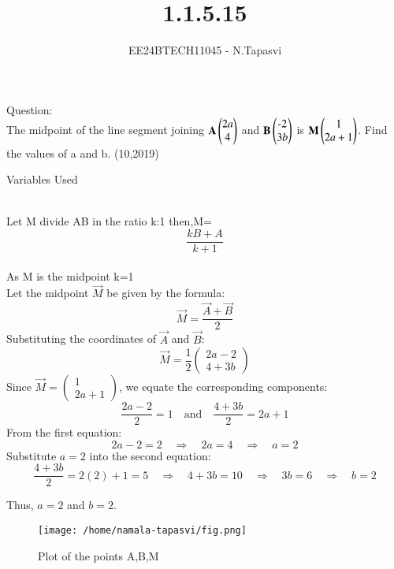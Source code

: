 \documentclass[journal]{IEEEtran}
\begin{document}

\vspace{3cm}

\title{1.1.5.15}
\author{EE24BTECH11045 - N.Tapasvi}
{\let\newpage\relax\maketitle}
Question:\\
The midpoint of the line segment joining $\mathbf{A}\begin{pmatrix}2a\\4\end{pmatrix}$ and $\mathbf{B}\begin{pmatrix}\text{-}2\\3b\end{pmatrix}$ is $\mathbf{M}\begin{pmatrix}1\\2a+1\end{pmatrix}$. Find the values of a and b.
\hfill (10,2019)

\solution
\begin{table}[h!]    
  \centering
  
  \caption{Variables Used}
  \label{tab1-1.5-15}
\end{table}\\

Let M divide AB in the ratio k:1
then,M=\[\frac{kB+A}{k+1}\]\\


As M is the midpoint k=1\\

Let the midpoint \( \vec{M} \) be given by the formula:
\[
\vec{M} = \frac{\vec{A} + \vec{B}}{2}
\]
Substituting the coordinates of \( \vec{A} \) and \( \vec{B} \):
\[
\vec{M} = \frac{1}{2} \begin{pmatrix} 2a - 2 \\ 4 + 3b \end{pmatrix}
\]
Since \( \vec{M} = \begin{pmatrix} 1 \\ 2a+1 \end{pmatrix} \), we equate the corresponding components:
\[
\frac{2a - 2}{2} = 1 \quad \text{and} \quad \frac{4 + 3b}{2} = 2a + 1
\]
From the first equation:
\[
2a - 2 = 2 \quad \Rightarrow \quad 2a = 4 \quad \Rightarrow \quad a = 2
\]
Substitute \( a = 2 \) into the second equation:
\[
\frac{4 + 3b}{2} = 2(2) + 1 = 5 \quad \Rightarrow \quad 4 + 3b = 10 \quad \Rightarrow \quad 3b = 6 \quad \Rightarrow \quad b = 2
\]

Thus, \( a = 2 \) and \( b = 2 \).


\begin{figure}[h!]
   \centering
	\texttt{[image: /home/namala-tapasvi/fig.png]}
   \caption{Plot of the points A,B,M}
   \label{stemplot}
\end{figure}
\end{document}
